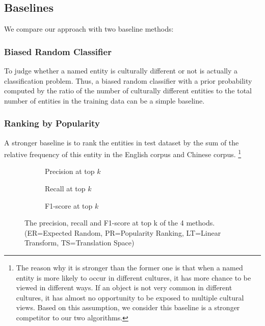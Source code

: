 \subsection{Baselines}
We compare our approach with two baseline methods:

\subsubsection{Biased Random Classifier}
To judge whether a named entity is culturally different or not is
actually a classification problem.
Thus, a biased random classifier with a prior probability computed by
the ratio of the number of culturally different entities to
the total number of entities in the training data can be
a simple baseline.

\subsubsection{Ranking by Popularity}
A stronger baseline is to rank the entities in test dataset by the sum of the relative frequency of
this entity in the English corpus and Chinese corpus.
\footnote{The reason why it is stronger than the former one is that when a named entity is more likely to occur in different cultures, it has more chance to be viewed in different ways.
If an object is not very common in different cultures, it has almost no opportunity to be
exposed to multiple cultural views.
Based on this assumption, we consider this baseline is a stronger competitor to our two algorithms.}  

\begin{figure*}[th!]
	\label{fig:atk}
	\begin{subfigure}{0.67\columnwidth}
		\resizebox{\columnwidth}{!}{}
		\caption{Precision at top $k$}
		\label{fig:precisionatk}
	\end{subfigure}
	\hfill
	\begin{subfigure}{0.67\columnwidth}
		\resizebox{\columnwidth}{!}{}
		\caption{Recall at top $k$}
		\label{fig:recallatk}
	\end{subfigure}
	\hfill
	\begin{subfigure}{0.67\columnwidth}
		\resizebox{\columnwidth}{!}{}
		\caption{F1-score at top $k$}
		\label{fig:f1atk}
		
	\end{subfigure}
	\caption{The precision, recall and F1-score at top k of the 4 methods. (ER=Expected Random, PR=Popularity Ranking, LT=Linear Transform, TS=Translation Space)}
\end{figure*}
